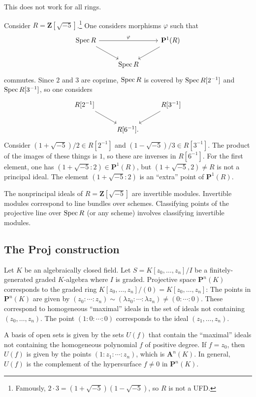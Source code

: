\documentclass [11 pt, oneside] {article}
\begin{document}
This does not work for all rings.

\begin{example}[ ]\label{}\text{}
Consider $R=\mathbf{Z}[\sqrt{-5} ]$.\footnote{Famously, $2\cdot 3 = (1+\sqrt{-5} ) (1-\sqrt{-5} )$, so $R$ is not a UFD.} One considers morphisms $\varphi$ such that
\[
\begin{tikzcd}
	\Spec R \ar[rr,"\varphi"] \ar[dr] &&\mathbf{P}^1(R)\ar[dl]\\
				       &\Spec R
\end{tikzcd}
\]
commutes. Since $2$ and $3$ are coprime, $\operatorname{Spec} R$ is covered by $\operatorname{Spec} R[2^{-1}]$ and $\operatorname{Spec} R[3^{-1}]$, so one considers
\[
\begin{tikzcd}
	R[2^{-1}] \ar[rd] && R[3^{-1}] \ar[dl]\\
			  &R[6^{-1}].
\end{tikzcd}
\]
Consider $(1+\sqrt{-5} ) /2\in R[2^{-1}]$ and $(1-\sqrt{-5} ) /3\in R[3^{-1}]$. The product of the images of these things is $1$, so these are inverses in $R[6^{-1}]$. For the first element, one has $(1+\sqrt{-5}:2 ) \in \mathbf{P}^1(R)$, but $(1+\sqrt{-5}, 2 ) \ne R$ is not a principal ideal. The element $(1+\sqrt{-5}:2 )$ is an ``extra'' point of $\mathbf{P}^1(R)$. 
\end{example}

\begin{remark}
	The nonprincipal ideals of $R=\mathbf{Z}[\sqrt{-5}] $ are invertible modules. Invertible modules correspond to line bundles over schemes. Classifying points of the projective line over $\operatorname{Spec} R$ (or any scheme) involves classifying invertible modules.
\end{remark}

\subsection{The Proj construction}
Let $K$ be an algebraically closed field. Let $S=K[z_0,\hdots, z_n]/I$ be a finitely-generated graded $K$-algebra where $I$ is graded. Projective space $\mathbf{P}^n(K)$ corresponds to the graded ring $K[z_0,\hdots, z_n] /(0)= K[z_0,\hdots,z_n]$: The points in $\mathbf{P}^n(K)$ are given by $(z_0:\cdots:z_n)\sim (\lambda z_0:\cdots:\lambda z_n)\ne (0:\cdots:0)$. These correspond to homogeneous ``maximal'' ideals in the set of ideals not containing $(z_0,\hdots,z_n)$. The point $(1:0:\cdots:0)$ corresponds to the ideal $(z_1,\hdots,z_n)$.

A basis of open sets is given by the sets $U(f)$ that contain the ``maximal'' ideals not containing the homogeneous polynomial $f$ of positive degree. If $f=z_0$, then $U(f)$ is given by the points $(1:z_1:\cdots:z_n)$, which is $\mathbf{A}^n(K)$. In general, $U(f)$ is the complement of the hypersurface $f\ne 0$ in $\mathbf{P}^n(K)$.
\end{document}
